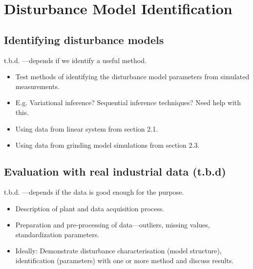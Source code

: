 \chapter{Disturbance Model Identification}
\label{chap-identification}

\section{Identifying disturbance models}

t.b.d. —depends if we identify a useful method.

\begin{itemize}
	\item Test methods of identifying the disturbance model parameters from simulated measurements.
	\item E.g. Variational inference? Sequential inference techniques?  Need help with this.
	\item Using data from linear system from section 2.1.
	\item Using data from grinding model simulations from section 2.3.
\end{itemize}

\section{Evaluation with real industrial data (t.b.d)}

t.b.d. —depends if the data is good enough for the purpose.

\begin{itemize}
	\item Description of plant and data acquisition process.
	\item Preparation and pre-processing of data—outliers, missing values, standardization parameters.
	\item Ideally: Demonstrate disturbance characterisation (model structure), identification (parameters) with one or more method and discuss results. 
\end{itemize}